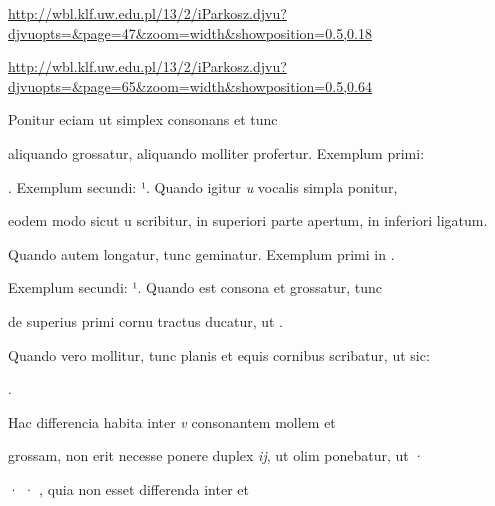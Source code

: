 

\newParkoszpage


{
\url{http://wbl.klf.uw.edu.pl/13/2/iParkosz.djvu?djvuopts=&page=47&zoom=width&showposition=0.5,0.18}

\url{http://wbl.klf.uw.edu.pl/13/2/iParkosz.djvu?djvuopts=&page=65&zoom=width&showposition=0.5,0.64}
}

\fullpreviouslines


{
\color{blue}
Ponitur eciam ut simplex consonans et tunc

}

\fulllines



aliquando grossatur, aliquando molliter profertur. Exemplum primi:  

. Exemplum secundi:  ¹. Quando igitur \textit{u} vocalis simpla ponitur,

eodem modo sicut u scribitur, in superiori parte apertum, in inferiori ligatum.

Quando autem longatur, tunc geminatur. Exemplum primi in  .



Exemplum secundi:  ¹. Quando est consona et grossatur, tunc

de superius primi cornu tractus ducatur, ut   .

Quando vero mollitur, tunc planis et equis cornibus scribatur, ut sic: 

\splitlines

 .

\indentK Hac differencia habita inter \textit{v} consonantem mollem et

\fulllines

grossam, non erit necesse ponere duplex \textit{ij}, ut olim ponebatur,  ut ·

· · , quia non esset differenda inter  et 

